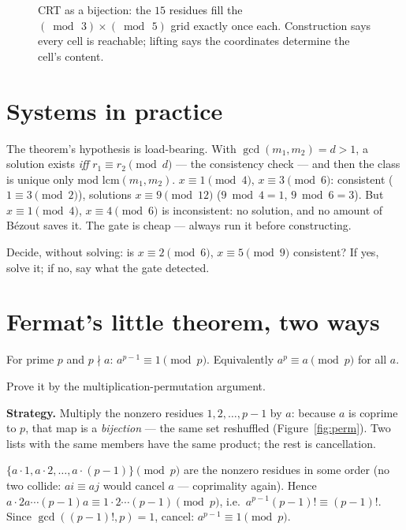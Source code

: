 \begin{figure}[ht]\centering

\caption{CRT as a bijection: the $15$ residues fill the
$(\bmod\, 3)\times(\bmod\, 5)$ grid exactly once each. Construction says
every cell is reachable; lifting says the coordinates determine the cell's
content.}
\label{fig:crtgrid}
\end{figure}

\section{Systems in practice}\label{sec:crtpractice}

The theorem's hypothesis is load-bearing. With $\gcd(m_1, m_2) = d > 1$,
a solution exists \emph{iff} $r_1 \equiv r_2 \pmod d$ --- the consistency
check --- and then the class is unique only mod
$\mathrm{lcm}(m_1, m_2)$. $x \equiv 1 \pmod 4$, $x \equiv 3 \pmod 6$:
consistent ($1 \equiv 3 \pmod 2$), solutions $x \equiv 9 \pmod{12}$ ($9 \bmod 4 = 1$, $9 \bmod 6 = 3$). But
$x \equiv 1 \pmod 4$, $x \equiv 4 \pmod 6$ is inconsistent: no solution,
and no amount of B\'ezout saves it. The gate is cheap --- always run it
before constructing.

\begin{exercise}[easy]\label{exr:crtgate}
Decide, without solving: is $x \equiv 2 \pmod 6$, $x \equiv 5 \pmod 9$
consistent? If yes, solve it; if no, say what the gate detected.
\end{exercise}

\section{Fermat's little theorem, two ways}\label{sec:flt}

\begin{theorem}\label{thm:flt}
For prime $p$ and $p \nmid a$: $a^{p-1} \equiv 1 \pmod p$. Equivalently
$a^p \equiv a \pmod p$ for all $a$.
\end{theorem}

\begin{example}\label{ex:flt}
Prove it by the multiplication-permutation argument.
\par\smallskip
\textbf{Strategy.} Multiply the nonzero residues $1, 2, \dots, p-1$ by
$a$: because $a$ is coprime to $p$, that map is a \emph{bijection} ---
the same set reshuffled (Figure~\ref{fig:perm}). Two lists with the same
members have the same product; the rest is cancellation.
\par\smallskip
\begin{solution}
$\{a \cdot 1, a \cdot 2, \dots, a\cdot(p-1)\} \pmod p$ are the nonzero
residues in some order (no two collide: $ai \equiv aj$ would cancel $a$
--- coprimality again). Hence
$a \cdot 2a \cdots (p-1)a \equiv 1 \cdot 2 \cdots (p-1) \pmod p$, i.e.\
$a^{p-1} (p-1)! \equiv (p-1)!$. Since $\gcd((p-1)!, p) = 1$, cancel:
$a^{p-1} \equiv 1 \pmod p$.
\end{solution}
\end{example}


